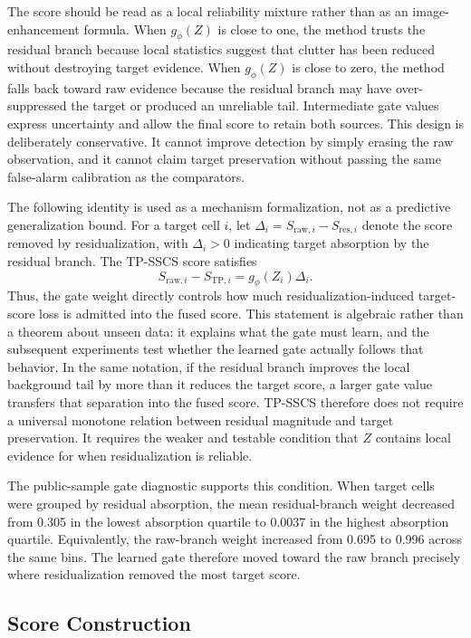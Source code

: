 \documentclass[journal]{IEEEtran}
\begin{document}
The score should be read as a local reliability mixture rather than as an image-enhancement formula. When $g_\phi(Z)$ is close to one, the method trusts the residual branch because local statistics suggest that clutter has been reduced without destroying target evidence. When $g_\phi(Z)$ is close to zero, the method falls back toward raw evidence because the residual branch may have over-suppressed the target or produced an unreliable tail. Intermediate gate values express uncertainty and allow the final score to retain both sources. This design is deliberately conservative. It cannot improve detection by simply erasing the raw observation, and it cannot claim target preservation without passing the same false-alarm calibration as the comparators.

The following identity is used as a mechanism formalization, not as a predictive generalization bound. For a target cell $i$, let $\Delta_i=S_{\mathrm{raw},i}-S_{\mathrm{res},i}$ denote the score removed by residualization, with $\Delta_i>0$ indicating target absorption by the residual branch. The TP-SSCS score satisfies
\begin{equation}
    S_{\mathrm{raw},i}-S_{\mathrm{TP},i}
    = g_\phi(Z_i)\Delta_i .
\end{equation}
Thus, the gate weight directly controls how much residualization-induced target-score loss is admitted into the fused score. This statement is algebraic rather than a theorem about unseen data: it explains what the gate must learn, and the subsequent experiments test whether the learned gate actually follows that behavior. In the same notation, if the residual branch improves the local background tail by more than it reduces the target score, a larger gate value transfers that separation into the fused score. TP-SSCS therefore does not require a universal monotone relation between residual magnitude and target preservation. It requires the weaker and testable condition that $Z$ contains local evidence for when residualization is reliable.

The public-sample gate diagnostic supports this condition. When target cells were grouped by residual absorption, the mean residual-branch weight decreased from 0.305 in the lowest absorption quartile to 0.0037 in the highest absorption quartile. Equivalently, the raw-branch weight increased from 0.695 to 0.996 across the same bins. The learned gate therefore moved toward the raw branch precisely where residualization removed the most target score.

\subsection{Score Construction}
\end{document}

